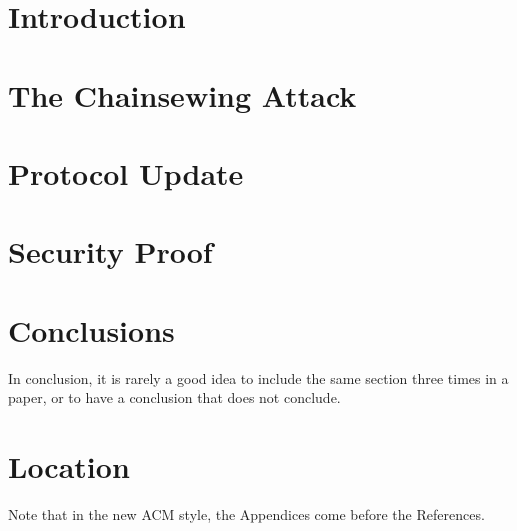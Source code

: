 \section{Introduction}
\cite{Backbone}\cite{nakamoto}\cite{NIPoPoWs}\cite{Zamyatin}\cite{selfish_mining}

\section{The Chainsewing Attack}


\section{Protocol Update}


\section{Security Proof}


\section{Conclusions}

In conclusion, it is rarely a good idea to include the same section three times in a paper, or to have a conclusion that does not conclude.

\appendix

\section{Location}

Note that in the new ACM style, the Appendices come before the References.

\begin{acks}
\end{acks}
